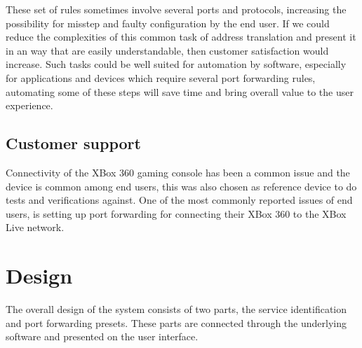 \documentclass[a4paper,11pt]{kth-bcs}
\begin{document}
These set of rules sometimes involve several ports and protocols, increasing the possibility for misstep and faulty configuration by the end user.
If we could reduce the complexities of this common task of address translation and present it in an way that are easily understandable, then customer satisfaction would increase.
Such tasks could be well suited for automation by software, especially for applications and devices which require several port forwarding rules, automating some of these steps will save time and bring overall value to the user experience.


   \section{Customer support}
Connectivity of the XBox 360 gaming console has been a common issue and the device is common among end users, this was also chosen as reference device to do tests and verifications against.
One of the most commonly reported issues of end users, is setting up port forwarding for connecting their XBox 360 to the XBox Live network.

\chapter{Design}

The overall design of the system consists of two parts, the service identification and port forwarding presets.
These parts are connected through the underlying software and presented on the user interface.
\end{document}
